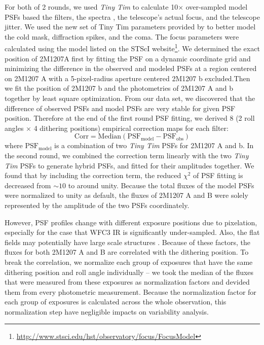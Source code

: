 \documentclass[apj]{emulateapj}
\newcommand{\tinytim}{\textit{Tiny Tim}}
\begin{document}
For both of 2 rounds, we used {\em Tiny Tim} to calculate 10$\times$
over-sampled model PSFs based the filters, the spectra 
\citep{Bonnefoy2014, Patience2010}, the telescope's actual focus, and
the telescope jitter.  We used the new set of Tiny Tim parameters
provided by \cite{Biretta2014} to better model the cold mask,
diffraction spikes, and the coma. The focus parameters were calculated
using the model listed on the STScI
website\footnote{\url{http://www.stsci.edu/hst/observatory/focus/FocusModel}}.
We determined the exact position of 2M1207A first by fitting the PSF
on a dynamic coordinate grid and minimizing the difference in the
observed and modeled PSFs at a region centered on 2M1207 A with a
5-pixel-radius aperture centered 2M1207 b excluded.Then we fit the
position of 2M1207 b and the photometries of 2M1207 A and b together
by least square optimization. From our data set, we discovered that
the difference of observed PSFs and model PSFs are very stable for
given PSF position. Therefore at the end of the first round PSF
fitting, we derived 8 (2 roll angles $\times$ 4 dithering positions)
empirical correction maps for each filter:
\begin{equation}
  \mathrm{Corr = Median(PSF_{model} - PSF_{obs} )}
\end{equation}
where $\mathrm{PSF_{model}}$ is a combination of two \tinytim{} PSFs
for 2M1207 A and b. In the second round, we combined the correction
term linearly with the two \tinytim{} PSFs to generate hybrid PSFs, and fitted for their
amplitudes together. We found that by including the correction term,
the reduced $\chi^{2}$ of PSF fitting is decreased from $\sim 10$ to
around unity. Because the total fluxes of the model PSFs were
normalized to unity as default, the fluxes of 2M1207 A and B were
solely represented by the amplitude of the two PSFs coordinately.

However, PSF profiles change with different exposure positions due to
pixelation, especially for the case that WFC3 IR is significantly
under-sampled. Also, the flat fields may potentially have large scale
structures \citep{dressel2012wide}. Because of these factors, the
fluxes for both 2M1207 A and B are correlated with the dithering
position. To break the correlation, we normalize each group of
exposures that have the same dithering position and roll angle
individually -- we took the median of the fluxes that were measured
from these exposures as normalization factors and devided them from
every photometric measurement. Because the normalization factor for
each group of exposures is calculated across the whole observation,
this normalization step have negligible impacts on variability
analysis.
\end{document}
